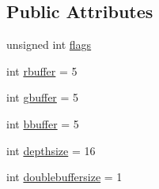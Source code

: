 \subsection*{Public Attributes}
\begin{DoxyCompactItemize}
\item 
unsigned int \hyperlink{structijengine_1_1FramebufferInfo_a7f874c6c0e1b04206adc6995e79926ff}{flags}
\item 
int \hyperlink{structijengine_1_1FramebufferInfo_aa8891e2879a75364bed1b6559ceaf575}{rbuffer} = 5
\item 
int \hyperlink{structijengine_1_1FramebufferInfo_a8e09a95dc7d365ac5cb77e5a87e876a0}{gbuffer} = 5
\item 
int \hyperlink{structijengine_1_1FramebufferInfo_ac434b7ef3cb86871cf42a943126b3d33}{bbuffer} = 5
\item 
int \hyperlink{structijengine_1_1FramebufferInfo_afb2371328a1647ebc4acc0757e825e9f}{depthsize} = 16
\item 
int \hyperlink{structijengine_1_1FramebufferInfo_a057843d29ea24330df32cacfdf8d79ea}{doublebuffersize} = 1
\end{DoxyCompactItemize}


